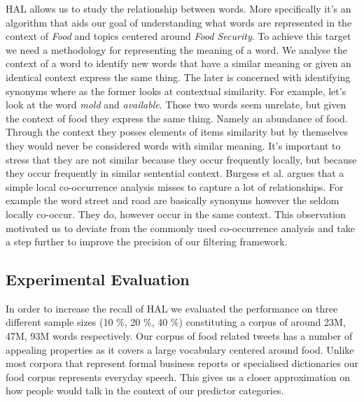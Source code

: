 HAL allows us to study the relationship between words. More specifically it's an algorithm that aids our goal of understanding what words are represented in the context of \emph{Food} and topics centered around \emph{Food Security}. To achieve this target we need a methodology for representing the meaning of a word. We analyse the context of a word to identify new words that have a similar meaning or given an identical context express the same thing. The later is concerned with identifying synonyms where as the former looks at contextual similarity. For example, let's look at the word \emph {mold} and \emph {available}. Those two words seem unrelate, but given the context of food they express the same thing.  Namely an abundance of food. Through the context they posses elements of items similarity but by themselves they would never be considered words with similar meaning. It's important to stress that they are not similar because they occur frequently locally, but because they occur frequently in similar sentential context. Burgess et al. \cite{burgess98} argues that a simple local co-occurrence analysis misses to capture a lot of relationships. For example the word street and road are basically synonyms however the seldom locally co-occur. They do, however occur in the same context. This observation motivated us to deviate from the commonly used co-occurrence analysis and take a step further to improve the precision of our filtering framework. 







 











\subsection{Experimental Evaluation}
\label{sec:exp_eval}

In order to increase the recall of HAL we evaluated the performance on three different sample sizes (10 \%, 20 \%, 40 \%) constituting a corpus of around 23M, 47M, 93M words respectively. Our corpus of food related tweets has a number of appealing properties as it covers a large vocabulary centered around food. Unlike most corpora that represent formal business reports or specialised dictionaries our food corpus represents everyday speech. This gives us a closer approximation on how people would talk in the context of our predictor categories. 

